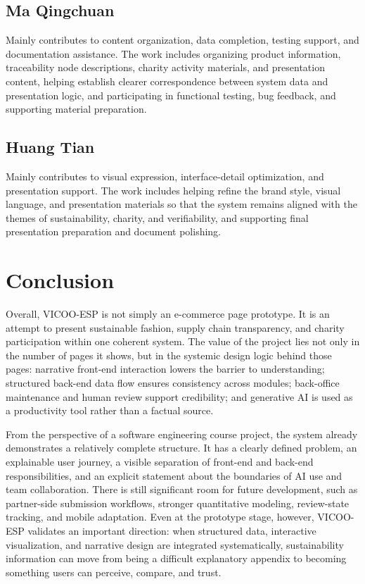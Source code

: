 \documentclass[11pt]{article}
\newcommand{\projectname}{VICOO-ESP}
\begin{document}
\subsection*{Ma Qingchuan}
Mainly contributes to content organization, data completion, testing support, and documentation assistance. The work includes organizing product information, traceability node descriptions, charity activity materials, and presentation content, helping establish clearer correspondence between system data and presentation logic, and participating in functional testing, bug feedback, and supporting material preparation.

\subsection*{Huang Tian}
Mainly contributes to visual expression, interface-detail optimization, and presentation support. The work includes helping refine the brand style, visual language, and presentation materials so that the system remains aligned with the themes of sustainability, charity, and verifiability, and supporting final presentation preparation and document polishing.

\section{Conclusion}
Overall, \projectname{} is not simply an e-commerce page prototype. It is an attempt to present sustainable fashion, supply chain transparency, and charity participation within one coherent system. The value of the project lies not only in the number of pages it shows, but in the systemic design logic behind those pages: narrative front-end interaction lowers the barrier to understanding; structured back-end data flow ensures consistency across modules; back-office maintenance and human review support credibility; and generative AI is used as a productivity tool rather than a factual source.

From the perspective of a software engineering course project, the system already demonstrates a relatively complete structure. It has a clearly defined problem, an explainable user journey, a visible separation of front-end and back-end responsibilities, and an explicit statement about the boundaries of AI use and team collaboration. There is still significant room for future development, such as partner-side submission workflows, stronger quantitative modeling, review-state tracking, and mobile adaptation. Even at the prototype stage, however, \projectname{} validates an important direction: when structured data, interactive visualization, and narrative design are integrated systematically, sustainability information can move from being a difficult explanatory appendix to becoming something users can perceive, compare, and trust.
\end{document}
